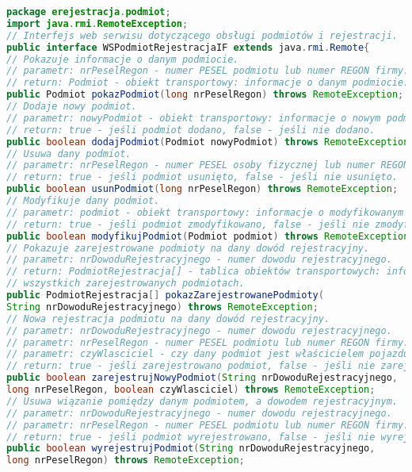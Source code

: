\begin{small}
\begin{lstlisting}[language=Java, frame=lines, numberstyle=\tiny, stepnumber=5, caption=Interfejs usługi Web Service: \texttt{WSPodmiotRejestracjaIF}\label{ws}., firstnumber=1]
package erejestracja.podmiot;
import java.rmi.RemoteException;
// Interfejs web serwisu dotyczącego obsługi podmiotów i rejestracji.
public interface WSPodmiotRejestracjaIF extends java.rmi.Remote{
// Pokazuje informacje o danym podmiocie.
// parametr: nrPeselRegon - numer PESEL podmiotu lub numer REGON firmy.
// return: Podmiot - obiekt transportowy: informacje o danym podmiocie.
public Podmiot pokazPodmiot(long nrPeselRegon) throws RemoteException;
// Dodaje nowy podmiot.
// parametr: nowyPodmiot - obiekt transportowy: informacje o nowym podmiocie.
// return: true - jeśli podmiot dodano, false - jeśli nie dodano.
public boolean dodajPodmiot(Podmiot nowyPodmiot) throws RemoteException;
// Usuwa dany podmiot.
// parametr: nrPeselRegon - numer PESEL osoby fizycznej lub numer REGON firmy.
// return: true - jeśli podmiot usunięto, false - jeśli nie usunięto.
public boolean usunPodmiot(long nrPeselRegon) throws RemoteException;
// Modyfikuje dany podmiot.
// parametr: podmiot - obiekt transportowy: informacje o modyfikowanym podmiocie.
// return: true - jeśli podmiot zmodyfikowano, false - jeśli nie zmodyfikowano.
public boolean modyfikujPodmiot(Podmiot podmiot) throws RemoteException;
// Pokazuje zarejestrowane podmioty na dany dowód rejestracyjny.
// parametr: nrDowoduRejestracyjnego - numer dowodu rejestracyjnego.
// return: PodmiotRejestracja[] - tablica obiektów transportowych: informacje o
// wszystkich zarejestrowanych podmiotach.
public PodmiotRejestracja[] pokazZarejestrowanePodmioty(
String nrDowoduRejestracyjnego) throws RemoteException;
// Nowa rejestracja podmiotu na dany dowód rejestracyjny.
// parametr: nrDowoduRejestracyjnego - numer dowodu rejestracyjnego.
// parametr: nrPeselRegon - numer PESEL podmiotu lub numer REGON firmy.
// parametr: czyWlasciciel - czy dany podmiot jest właścicielem pojazdu.
// return: true - jeśli zarejestrowano podmiot, false - jeśli nie zarejestrowano.
public boolean zarejestrujNowyPodmiot(String nrDowoduRejestracyjnego,
long nrPeselRegon, boolean czyWlasciciel) throws RemoteException;
// Usuwa wiązanie pomiędzy danym podmiotem, a dowodem rejestracyjnym.
// parametr: nrDowoduRejestracyjnego - numer dowodu rejestracyjnego.
// parametr: nrPeselRegon - numer PESEL podmiotu lub numer REGON firmy.
// return: true - jeśli podmiot wyrejestrowano, false - jeśli nie wyrejestrowano.
public boolean wyrejestrujPodmiot(String nrDowoduRejestracyjnego,
long nrPeselRegon) throws RemoteException;
\end{lstlisting} 
\end{small}


